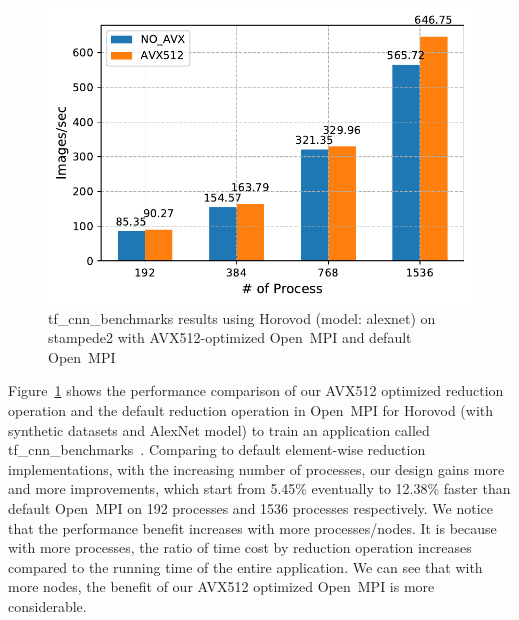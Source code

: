 \documentclass[sigconf]{acmart}
\newcommand{\ompi}[0]{Open~MPI\xspace}
\begin{document}
\begin{figure}[h]
    \centering
    \includegraphics[width=\linewidth]{horovod_tacc.pdf}
    \caption{tf\_cnn\_benchmarks results using Horovod (model: alexnet) on stampede2 
    with AVX512-optimized \ompi and default \ompi}
    \label{fig:horovod_tacc}
\end{figure}

Figure~\ref{fig:horovod_tacc} shows the performance comparison of
our AVX512 optimized reduction operation and the default reduction operation in \ompi for Horovod (with synthetic datasets and AlexNet model) to train an application called tf\_cnn\_benchmarks~\cite{cnn_Tensorflow}.
Comparing to default element-wise reduction
implementations, with the increasing number of processes,
our design gains more and more improvements, which start from 5.45\% eventually to 12.38\% faster than default \ompi on 192 processes and 1536 processes respectively.
We notice that the performance benefit increases with more processes/nodes. 
It is because with more processes, the ratio of time cost by reduction operation increases 
compared to the running time of the entire application. 
We can see that with more nodes, the benefit of our AVX512 optimized \ompi is more considerable.

\end{document}
